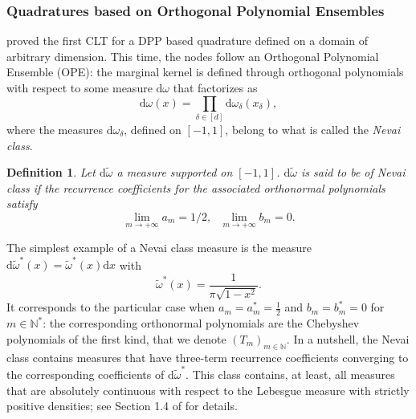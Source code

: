 \documentclass[twoside,11pt]{book}
\newtheorem{definition}{Definition}
\numberwithin{theorem}{chapter}
\numberwithin{definition}{chapter}
\numberwithin{proposition}{chapter}
\numberwithin{corollary}{chapter}
\numberwithin{example}{chapter}
\numberwithin{lemma}{chapter}
\begin{document}
\subsubsection{Quadratures based on Orthogonal Polynomial Ensembles}
\cite{BaHa16} proved the first CLT for a DPP based quadrature defined on a domain of arbitrary dimension. This time, the nodes follow an Orthogonal Polynomial Ensemble (OPE): the marginal kernel is  defined through orthogonal polynomials with respect to some measure $\mathrm{d}\omega$ that factorizes as
\begin{equation}
\mathrm{d}\omega(x) = \prod\limits_{\delta \in [d]} \mathrm{d}\omega_{\delta}(x_{\delta}),
\end{equation}
where the measures $\mathrm{d}\omega_{\delta}$, defined on $[-1,1]$, belong to what is called the \emph{Nevai class}. 
\begin{definition}
Let $\mathrm{d}\tilde{\omega}$ a measure supported on $[-1,1]$. $\mathrm{d}\tilde{\omega}$ is said to be of Nevai class if 
the recurrence coefficients for
the associated orthonormal polynomials satisfy
\begin{equation}
\lim\limits_{m \rightarrow +\infty} a_{m} = 1/2, \:\:\: \lim\limits_{m \rightarrow +\infty} b_{m} = 0.
\end{equation}
\end{definition}
The simplest example of a Nevai class measure is the measure $\mathrm{d}\tilde{\omega}^{*}(x) = \tilde{\omega}^{*}(x) \mathrm{d}x$ with 
\begin{equation}\label{eq:omega_star}
\tilde{\omega}^{*}(x) = \frac{1}{\pi\sqrt{1-x^{2}}}.
\end{equation}
It corresponds to the particular case when $a_{m} = a^{*}_{m} = \frac{1}{2}$ and $b_m =  b^{*}_{m} =0$ for $m \in \mathbb{N}^{*}$: the corresponding orthonormal polynomials are the Chebyshev polynomials of the first kind, that we denote $(T_{m})_{m \in \mathbb{N}}$.
In a nutshell, the Nevai class contains measures that have three-term recurrence coefficients converging to the corresponding coefficients of $\mathrm{d}\tilde{\omega}^{*}$.
 This class contains, at least, all measures that are absolutely continuous with respect to the Lebesgue measure with strictly positive densities; see Section 1.4 of \citep{Sim10} for details. 
\end{document}
